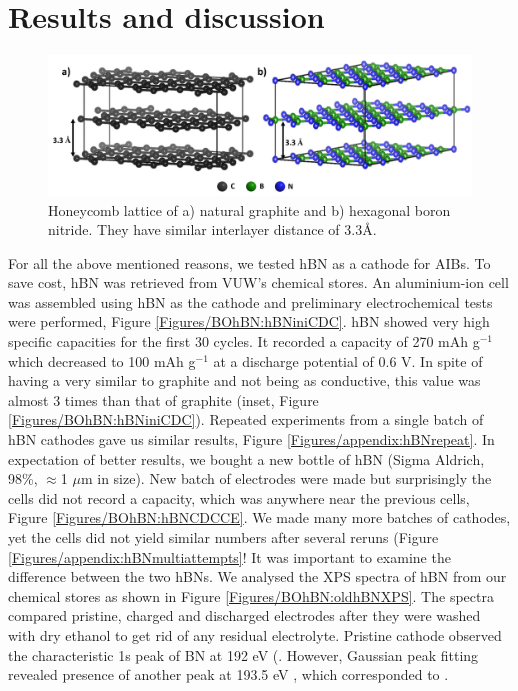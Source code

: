 \section{Results and discussion}
\begin{figure}[tbh!]
\centering
\includegraphics[width=\textwidth]{Figures/BOhBN/grpBNcomp}
\caption{Honeycomb lattice of a) natural graphite and b) hexagonal boron nitride. They have similar interlayer distance of 3.3\AA.}
\label{Figures/BOhBN:grpBNcomp}
\end{figure}
For all the above mentioned reasons, we tested hBN as a cathode for AIBs. To save cost, hBN was retrieved from VUW's chemical stores. An aluminium-ion cell was assembled using hBN as the cathode and preliminary electrochemical tests were performed, Figure \ref{Figures/BOhBN:hBNiniCDC}. hBN showed very high specific capacities for the first 30 cycles. It recorded a capacity of 270 mAh g$^{-1}$ which decreased to 100 mAh g$^{-1}$ at a discharge potential of 0.6 V. In spite of having a very similar to graphite and not being as conductive, this value was almost 3 times than that of graphite (inset, Figure \ref{Figures/BOhBN:hBNiniCDC}). Repeated experiments from a single batch of hBN cathodes gave us similar results, Figure \ref{Figures/appendix:hBNrepeat}. In expectation of better results, we bought a new bottle of hBN (Sigma Aldrich, 98\%, $\approx$1 $\mu$m in size). New batch of electrodes were made but surprisingly the cells did not record a capacity, which was anywhere near the previous cells, Figure \ref{Figures/BOhBN:hBNCDCCE}. We made many more batches of cathodes, yet the cells did not yield similar numbers after several reruns (Figure \ref{Figures/appendix:hBNmultiattempts}! It was important to examine the difference between the two hBNs. We analysed the XPS spectra of hBN from our chemical stores as shown in Figure \ref{Figures/BOhBN:oldhBNXPS}. The spectra compared pristine, charged and discharged electrodes after they were washed with dry ethanol to get rid of any residual electrolyte. Pristine cathode observed the characteristic 1s peak of BN at 192 eV (. However, Gaussian peak fitting revealed presence of another peak at 193.5 eV , which corresponded to . 
